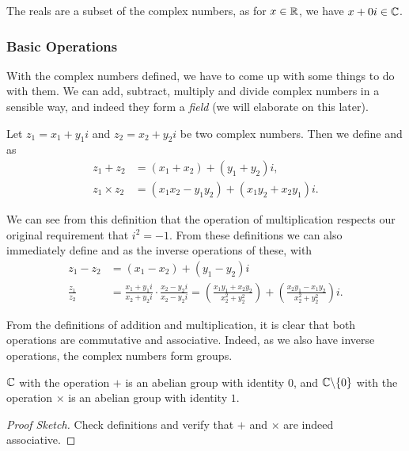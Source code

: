 \documentclass[a4paper]{scrartcl}
\begin{document}
The reals are a subset of the complex numbers, as for $x \in \mathbb{R}$, we have $x + 0i \in \mathbb{C}$. 

\subsubsection{Basic Operations}

With the complex numbers defined, we have to come up with some things to do with them.
We can add, subtract, multiply and divide complex numbers in a sensible way, and indeed they form a \emph{field} (we will elaborate on this later).

\begin{definition}
	Let $z_1 = x_1 + y_1 i$ and $z_2 = x_2 + y_2 i$ be two complex numbers. Then we define  and  as
	\begin{align*}
		z_1 + z_2 &= (x_1 + x_2) + (y_1 + y_2)i,\\
		z_1 \times z_2 &= (x_1 x_2 - y_1 y_2) + (x_1 y_2 + x_2 y_1)i.
	\end{align*}
\end{definition}

We can see from this definition that the operation of multiplication respects our original requirement that $i^2 = -1$. From these definitions we can also immediately define  and  as the inverse operations of these, with
\begin{align*}
	z_1 - z_2 &= (x_1 - x_2) + (y_1 - y_2)i \\
	\frac{z_1}{z_2} &= \frac{x_1 + y_1 i}{x_2 + y_2 i} \cdot \frac{x_2 - y_2i}{x_2 - y_2 i} = \left(\frac{x_1y_1 + x_2 y_2}{x_2^2 + y_2^2}\right) + \left(\frac{x_2y_1 - x_1 y_2}{x_2^2 + y_2^2}\right)i.
\end{align*}

From the definitions of addition and multiplication, it is clear that both operations are commutative and associative. Indeed, as we also have inverse operations, the complex numbers form groups.

\begin{proposition}[$\C$ is a Group]
	$\C$ with the operation $+$ is an abelian group with identity $0$, and $\mathbb{C} \backslash \{0\}$ with the operation $\times$ is an abelian group with identity $1$.
\end{proposition}
\begin{proof}[Proof Sketch]
	Check definitions and verify that $+$ and $\times$ are indeed associative.
\end{proof}
\end{document}
